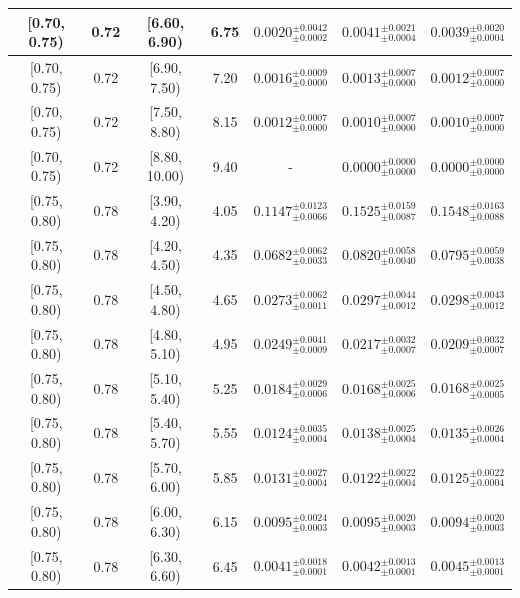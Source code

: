 \begin{longtable}{|c|c|c|c|c|c|c|}
\hline
[0.70, 0.75) & 0.72 & [6.60, 6.90) & 6.75 & $0.0020^{ \pm 0.0042 }_{ \pm 0.0002 }$ & $0.0041^{ \pm 0.0021 }_{ \pm 0.0004 }$ & $0.0039^{ \pm 0.0020 }_{ \pm 0.0004 }$ \\ 
\hline
[0.70, 0.75) & 0.72 & [6.90, 7.50) & 7.20 & $0.0016^{ \pm 0.0009 }_{ \pm 0.0000 }$ & $0.0013^{ \pm 0.0007 }_{ \pm 0.0000 }$ & $0.0012^{ \pm 0.0007 }_{ \pm 0.0000 }$ \\ 
\hline
[0.70, 0.75) & 0.72 & [7.50, 8.80) & 8.15 & $0.0012^{ \pm 0.0007 }_{ \pm 0.0000 }$ & $0.0010^{ \pm 0.0007 }_{ \pm 0.0000 }$ & $0.0010^{ \pm 0.0007 }_{ \pm 0.0000 }$ \\ 
\hline
[0.70, 0.75) & 0.72 & [8.80, 10.00) & 9.40 & - & $0.0000^{ \pm 0.0000 }_{ \pm 0.0000 }$ & $0.0000^{ \pm 0.0000 }_{ \pm 0.0000 }$ \\ 
\hline
[0.75, 0.80) & 0.78 & [3.90, 4.20) & 4.05 & $0.1147^{ \pm 0.0123 }_{ \pm 0.0066 }$ & $0.1525^{ \pm 0.0159 }_{ \pm 0.0087 }$ & $0.1548^{ \pm 0.0163 }_{ \pm 0.0088 }$ \\ 
\hline
[0.75, 0.80) & 0.78 & [4.20, 4.50) & 4.35 & $0.0682^{ \pm 0.0062 }_{ \pm 0.0033 }$ & $0.0820^{ \pm 0.0058 }_{ \pm 0.0040 }$ & $0.0795^{ \pm 0.0059 }_{ \pm 0.0038 }$ \\ 
\hline
[0.75, 0.80) & 0.78 & [4.50, 4.80) & 4.65 & $0.0273^{ \pm 0.0062 }_{ \pm 0.0011 }$ & $0.0297^{ \pm 0.0044 }_{ \pm 0.0012 }$ & $0.0298^{ \pm 0.0043 }_{ \pm 0.0012 }$ \\ 
\hline
[0.75, 0.80) & 0.78 & [4.80, 5.10) & 4.95 & $0.0249^{ \pm 0.0041 }_{ \pm 0.0009 }$ & $0.0217^{ \pm 0.0032 }_{ \pm 0.0007 }$ & $0.0209^{ \pm 0.0032 }_{ \pm 0.0007 }$ \\ 
\hline
[0.75, 0.80) & 0.78 & [5.10, 5.40) & 5.25 & $0.0184^{ \pm 0.0029 }_{ \pm 0.0006 }$ & $0.0168^{ \pm 0.0025 }_{ \pm 0.0006 }$ & $0.0168^{ \pm 0.0025 }_{ \pm 0.0005 }$ \\ 
\hline
[0.75, 0.80) & 0.78 & [5.40, 5.70) & 5.55 & $0.0124^{ \pm 0.0035 }_{ \pm 0.0004 }$ & $0.0138^{ \pm 0.0025 }_{ \pm 0.0004 }$ & $0.0135^{ \pm 0.0026 }_{ \pm 0.0004 }$ \\ 
\hline
[0.75, 0.80) & 0.78 & [5.70, 6.00) & 5.85 & $0.0131^{ \pm 0.0027 }_{ \pm 0.0004 }$ & $0.0122^{ \pm 0.0022 }_{ \pm 0.0004 }$ & $0.0125^{ \pm 0.0022 }_{ \pm 0.0004 }$ \\ 
\hline
[0.75, 0.80) & 0.78 & [6.00, 6.30) & 6.15 & $0.0095^{ \pm 0.0024 }_{ \pm 0.0003 }$ & $0.0095^{ \pm 0.0020 }_{ \pm 0.0003 }$ & $0.0094^{ \pm 0.0020 }_{ \pm 0.0003 }$ \\ 
\hline
[0.75, 0.80) & 0.78 & [6.30, 6.60) & 6.45 & $0.0041^{ \pm 0.0018 }_{ \pm 0.0001 }$ & $0.0042^{ \pm 0.0013 }_{ \pm 0.0001 }$ & $0.0045^{ \pm 0.0013 }_{ \pm 0.0001 }$ \\ 

\end{longtable}
